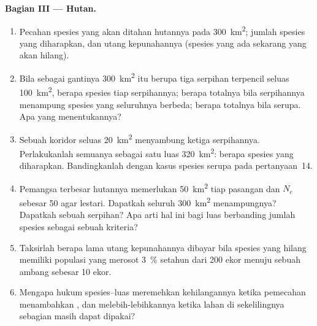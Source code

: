 \begin{problem}
\medskip
\noindent\textbf{Bagian III --- Hutan.}
\begin{enumerate}[resume]
  \item Pecahan spesies yang akan ditahan hutannya pada \qty{300}{km^2};
        jumlah spesies yang diharapkan, dan utang kepunahannya (spesies
        yang ada sekarang yang akan hilang).
  \item Bila sebagai gantinya \qty{300}{km^2} itu berupa tiga serpihan
        terpencil seluas \qty{100}{km^2}, berapa spesies tiap serpihannya;
        berapa totalnya bila serpihannya menampung spesies yang seluruhnya
        berbeda; berapa totalnya bila serupa. Apa yang menentukannya?
  \item Sebuah koridor seluas \qty{20}{km^2} menyambung ketiga
        serpihannya. Perlakukanlah semuanya sebagai satu luas
        \qty{320}{km^2}: berapa spesies yang diharapkan. Bandingkanlah
        dengan kasus spesies serupa pada pertanyaan~14.
  \item Pemangsa terbesar hutannya memerlukan \qty{50}{km^2} tiap pasangan
        dan $N_{e}$ sebesar 50 agar lestari. Dapatkah seluruh
        \qty{300}{km^2} menampungnya? Dapatkah sebuah serpihan? Apa arti
        hal ini bagi luas berbanding jumlah spesies sebagai sebuah kriteria?
  \item Taksirlah berapa lama utang kepunahannya dibayar bila spesies yang
        hilang memiliki populasi yang merosot \qty{3}{\%} setahun dari 200
        ekor menuju sebuah ambang  sebesar 10 ekor.
  \item Mengapa hukum spesies--luas meremehkan kehilangannya ketika
        pemecahan menambahkan , dan melebih-lebihkannya ketika
        lahan di sekelilingnya sebagian masih dapat dipakai?
\end{enumerate}


\end{problem}
